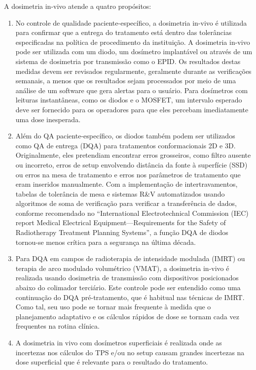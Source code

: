 \documentclass[11pt,a4paper]{article}
\begin{document}
	A dosimetria in-vivo atende a quatro propósitos:

	\begin{enumerate}[label=\textcolor{CarnationPink}{\roman*.}]
		\item No controle de qualidade paciente-específico, a dosimetria in-vivo é utilizada para confirmar que a entrega do tratamento está dentro das tolerâncias especificadas na política de procedimento da instituição. A dosimetria in-vivo pode ser utilizada com um diodo, um dosímetro implantável ou através de um sistema de dosimetria por transmissão como o EPID. Os resultados destas medidas devem ser revisados regularmente, geralmente durante as verificações semanais, a menos que os resultados sejam processados por meio de uma análise de um software que gera alertas para o usuário. Para dosímetros com leituras instantâneas, como os diodos e o MOSFET, um intervalo esperado deve ser fornecido para os operadores para que eles percebam imediatamente uma dose inesperada.
		
		\item Além do QA paciente-específico, os diodos também podem ser utilizados como QA de entrega (DQA) para tratamentos conformacionais 2D e 3D. Originalmente, eles pretendiam encontrar erros grosseiros, como filtro ausente ou incorreto, erros de setup envolvendo distância da fonte à superfície (SSD) ou erros na mesa de tratamento e erros nos parâmetros de tratamento que eram inseridos manualmente. Com a implementação de intertravamentos, tabelas de tolerância de mesa e sistemas R\&V automatizados usando algoritmos de soma de verificação para verificar a transferência de dados, conforme recomendado no ``International Electrotechnical Commission (IEC) report Medical Electrical Equipment—Requirements for the Safety of Radiotherapy Treatment Planning Systems'', a função DQA de diodos tornou-se menos crítica para a segurança na última década.
		
		\item Para DQA em campos de radioterapia de intensidade modulada (IMRT) ou terapia de arco modulado volumétrico (VMAT), a dosimetria in-vivo é realizada usando dosimetria de transmissão com dispositivos posicionados abaixo do colimador terciário. Este controle pode ser entendido como uma continuação do DQA pré-tratamento, que é habitual nas técnicas de IMRT. Como tal, seu uso pode se tornar mais frequente à medida que o planejamento adaptativo e os cálculos rápidos de dose se tornam cada vez frequentes na rotina clínica.
		
		\item A dosimetria in vivo com dosímetros superficiais é realizada onde as incertezas nos cálculos do TPS e/ou no setup causam grandes incertezas na dose superficial que é relevante para o resultado do tratamento.
	\end{enumerate}
\end{document}
